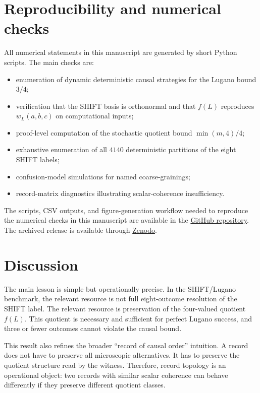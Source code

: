 \documentclass[11pt,a4paper]{article}
\begin{document}
\section{Reproducibility and numerical checks}
\label{sec:reproducibility}

All numerical statements in this manuscript are generated by short Python scripts.  The main checks are:
\begin{itemize}[leftmargin=2em]
    \item enumeration of dynamic deterministic causal strategies for the Lugano bound $3/4$;
    \item verification that the SHIFT basis is orthonormal and that $f(L)$ reproduces $w_L(a,b,c)$ on computational inputs;
    \item proof-level computation of the stochastic quotient bound $\min(m,4)/4$;
    \item exhaustive enumeration of all $4140$ deterministic partitions of the eight SHIFT labels;
    \item confusion-model simulations for named coarse-grainings;
    \item record-matrix diagnostics illustrating scalar-coherence insufficiency.
\end{itemize}
The scripts, CSV outputs, and figure-generation workflow needed to reproduce the numerical checks in this manuscript are available in the \href{https://github.com/bringmetheural/minimal-shift-lugano-quotients}{GitHub repository}.  The archived release is available through \href{https://doi.org/10.5281/zenodo.20128994}{Zenodo}.

\section{Discussion}
\label{sec:discussion}

The main lesson is simple but operationally precise.  In the SHIFT/Lugano benchmark, the relevant resource is not full eight-outcome resolution of the SHIFT label.  The relevant resource is preservation of the four-valued quotient $f(L)$.  This quotient is necessary and sufficient for perfect Lugano success, and three or fewer outcomes cannot violate the causal bound.

This result also refines the broader ``record of causal order'' intuition.  A record does not have to preserve all microscopic alternatives.  It has to preserve the quotient structure read by the witness.  Therefore, record topology is an operational object: two records with similar scalar coherence can behave differently if they preserve different quotient classes.
\end{document}
